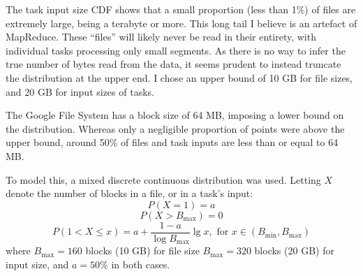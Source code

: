 The task input size CDF shows that a small proportion (less than 1\%) of files are extremely large, being a terabyte or more. This long tail I believe is an artefact of MapReduce. These ``files'' will likely never be read in their entirety, with individual tasks processing only small segments. As there is no way to infer the true number of bytes read from the data, it seems prudent to instead truncate the distribution at the upper end. I chose an upper bound of 10 GB for file sizes, and 20 GB for input sizes of tasks.

The Google File System has a block size of 64 MB, imposing a lower bound on the distribution. Whereas only a negligible proportion of points were above the upper bound, around 50\% of files and task inputs are less than or equal to 64 MB. 

To model this, a mixed discrete continuous distribution was used. Letting $X$ denote the number of blocks in a file, or in a task's input:
\[P\left(X=1\right)=a\]
\[P\left(X>B_{\mathrm{max}}\right)=0\]
\[P(1<X\leq x)=a+\frac{1-a}{\log{B_{\mathrm{max}}}}\lg x,\text{ for }x\in\left(B_{\mathrm{min}},B_{\mathrm{max}}\right)\]
where $B_{\mathrm{max}} = 160$ blocks (10 GB) for file size $B_{\mathrm{max}} = 320$ blocks (20 GB) for input size, and $a = 50\%$ in both cases.